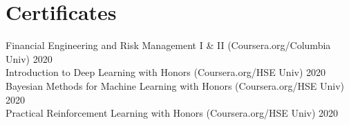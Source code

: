\documentclass[11pt]{../yhlcv}
\begin{document}
\section*{Certificates}

Financial Engineering and Risk Management I \& II (Coursera.org/Columbia Univ) \hfill 2020 \\
Introduction to Deep Learning with Honors (Coursera.org/HSE Univ)  \hfill 2020 \\
Bayesian Methods for Machine Learning with Honors (Coursera.org/HSE Univ)  \hfill 2020 \\
Practical Reinforcement Learning with Honors (Coursera.org/HSE Univ)  \hfill 2020 \\
\end{document}
